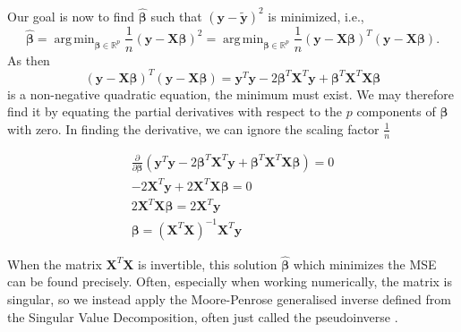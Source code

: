 \documentclass{article}
\DeclareMathOperator*{\argmin}{arg\,min}
\begin{document}
Our goal is now to find $\boldsymbol{\hat{\beta}}$ such that $\left( \boldsymbol{y} - \boldsymbol{\tilde{y}} \right)^2$ is minimized, i.e.,
\begin{equation*}
    \boldsymbol{\hat{\beta}}  = \argmin_{\boldsymbol{\beta} \in \mathbb{R}^p} \frac{1}{n} \left( \boldsymbol{y} - \textbf{X} \boldsymbol{\beta} \right)^2 = \argmin_{\boldsymbol{\beta} \in \mathbb{R}^p} \frac{1}{n} \left( \boldsymbol{y} - \textbf{X} \boldsymbol{\beta} \right)^T \left( \boldsymbol{y} - \textbf{X} \boldsymbol{\beta} \right).
\end{equation*}
As then
\begin{equation*}
    \left( \boldsymbol{y} - \textbf{X} \boldsymbol{\beta} \right)^T \left( \boldsymbol{y} - \textbf{X} \boldsymbol{\beta} \right) = \boldsymbol{y}^T \boldsymbol{y} - 2 \boldsymbol{\beta}^T \textbf{X}^T \boldsymbol{y} + \boldsymbol{\beta}^T \textbf{X}^T \textbf{X} \boldsymbol{\beta} 
\end{equation*}
is a non-negative quadratic equation, the minimum must exist. We may therefore find it by equating the partial derivatives with respect to the $p$ components of $\boldsymbol{\beta}$ with zero. In finding the derivative, we can ignore the scaling factor $\frac{1}{n}$

\begin{gather*}
    \frac{\partial}{\partial \boldsymbol{\beta}} \left( \boldsymbol{y}^T \boldsymbol{y} - 2 \boldsymbol{\beta}^T \textbf{X}^T \boldsymbol{y} + \boldsymbol{\beta}^T \textbf{X}^T \textbf{X} \boldsymbol{\beta} \right) = 0 \\
    -2 \textbf{X}^T \boldsymbol{y} + 2 \textbf{X}^T \boldsymbol{X \beta} = 0 \\
    2 \textbf{X}^T \boldsymbol{X \beta} = 2 \textbf{X}^T \boldsymbol{y} \\
    \boldsymbol{\beta} = \left( \textbf{X}^T \textbf{X} \right)^{-1} \textbf{X}^T \boldsymbol{y}
\end{gather*}

When the matrix $\textbf{X}^T \textbf{X}$ is invertible, this solution $\boldsymbol{\hat{\beta}}$ which minimizes the MSE can be found precisely. Often, especially when working numerically, the matrix is singular, so we instead apply the Moore-Penrose generalised inverse defined from the Singular Value Decomposition, often just called the pseudoinverse \cite[p.~74--82]{introNumeric}.


\end{document}
